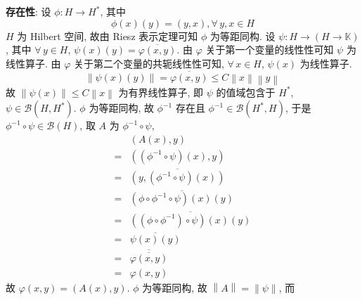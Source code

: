 \documentclass[../main.tex]{subfiles}
\begin{document}
\noindent \textbf{存在性}:
设 $\phi : H \to H^*$, 其中
\[
    \phi \left( x \right) \left( y \right) = \left( y, x \right)
    , \forall \, y, x \in H
\]
$H$ 为 Hilbert 空间, 故由 Riesz 表示定理可知 $\phi$ 为等距同构.
设 $\psi : H \to \left( H \to \mathbb{K} \right)$, 其中 $\forall \, y \in H$, $\psi \left( x \right) \left( y \right) = \overline{\varphi \left( x, y \right)}$.
由 $\varphi$ 关于第一个变量的线性性可知 $\psi$ 为线性算子.
由 $\varphi$ 关于第二个变量的共轭线性性可知, $\forall \, x \in H$, $\psi \left( x \right)$ 为线性算子.
\[
    \left\| \psi \left( x \right) \left( y \right) \right\|
    =
    \overline{\varphi \left( x, y \right)}
    \leqslant
    C \left\| x \right\| \left\| y \right\|
\]
故 $\left\| \psi \left( x \right) \right\| \leqslant C \left\| x \right\|$ 为有界线性算子,
即 $\psi$ 的值域包含于 $H^*$, $\psi \in \mathscr{B} \left( H, H^* \right)$.
$\phi$ 为等距同构, 故 $\phi^{-1}$ 存在且 $\phi^{-1} \in \mathscr{B} \left( H^*, H \right)$,
于是 $\phi^{-1} \circ \psi \in \mathscr{B} \left( H \right)$,
取 $A$ 为 $\phi^{-1} \circ \psi$,
\begin{align*}
     & \left( A \left( x \right), y \right) \\
    =& \left( \left( \phi^{-1} \circ \psi \right) \left( x \right), y \right) \\
    =& \overline{\left( y, \left( \phi^{-1} \circ \psi \right) \left( x \right) \right)} \\
    =& \overline{\left( \phi \circ \phi^{-1} \circ \psi \right) \left( x \right) \left( y \right)} \\
    =& \overline{\left( \left( \phi \circ \phi^{-1} \right) \circ \psi \right) \left( x \right) \left( y \right)} \\
    =& \overline{\psi \left( x \right) \left( y \right)} \\
    =& \overline{\overline{\varphi \left( x, y \right)}} \\
    =& \varphi \left( x, y \right)
\end{align*}
故 $\varphi \left( x, y \right) = \left( A \left( x \right), y \right)$.
$\phi$ 为等距同构, 故 $\left\| A \right\| = \left\| \psi \right\|$, 而
\end{document}

